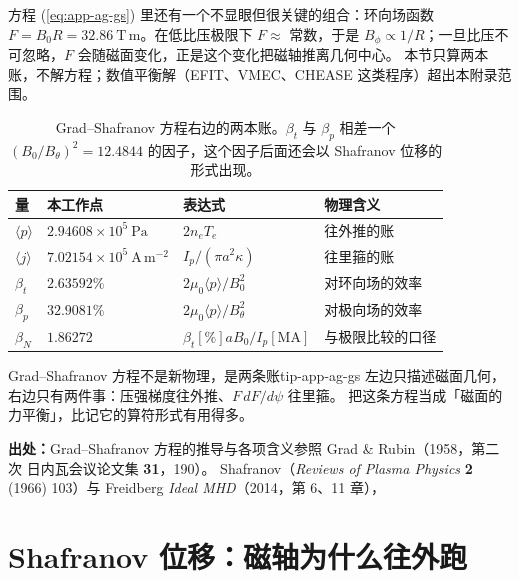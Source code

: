 方程 (\ref{eq:app-ag-gs}) 里还有一个不显眼但很关键的组合：环向场函数
$F=B_0R = 32.86\ \mathrm{T\,m}$。在低比压极限下 $F\approx$ 常数，于是
$B_\phi\propto 1/R$；一旦比压不可忽略，$F$ 会随磁面变化，正是这个变化把磁轴推离几何中心。
本节只算两本账，不解方程；数值平衡解（EFIT、VMEC、CHEASE 这类程序）超出本附录范围。

\begin{table}[htbp]
\centering
\small
\caption{Grad--Shafranov 方程右边的两本账。$\beta_t$ 与 $\beta_p$ 相差一个
$(B_0/B_\theta)^2 = 12.4844$ 的因子，这个因子后面还会以 Shafranov 位移的形式出现。}
\label{tab:app-ag-gs}
\begin{tabular}{p{3.8cm}p{3.0cm}p{3.6cm}p{4.5cm}}
\toprule
量 & 本工作点 & 表达式 & 物理含义 \\
\midrule
$\langle p\rangle$ & $2.94608\times10^{5}\ \mathrm{Pa}$ & $2n_eT_e$ & 往外推的账 \\
$\langle j\rangle$ & $7.02154\times10^{5}\ \mathrm{A\,m^{-2}}$ & $I_p/(\pi a^2\kappa)$ & 往里箍的账 \\
$\beta_t$ & $2.63592\%$ & $2\mu_0\langle p\rangle/B_0^2$ & 对环向场的效率 \\
$\beta_p$ & $32.9081\%$ & $2\mu_0\langle p\rangle/B_\theta^2$ & 对极向场的效率 \\
$\beta_N$ & $1.86272$ & $\beta_t[\%]aB_0/I_p[\mathrm{MA}]$ & 与极限比较的口径 \\
\bottomrule
\end{tabular}

\end{table}

\begin{tip}{Grad--Shafranov 方程不是新物理，是两条账}{tip-app-ag-gs}
左边只描述磁面几何，右边只有两件事：压强梯度往外推、$F\,dF/d\psi$ 往里箍。
把这条方程当成「磁面的力平衡」，比记它的算符形式有用得多。
\end{tip}

{\footnotesize
\textbf{出处：}Grad--Shafranov 方程的推导与各项含义参照 Grad \& Rubin（1958，第二次
日内瓦会议论文集 \textbf{31}，190）。
Shafranov（\emph{Reviews of Plasma Physics}
\textbf{2} (1966) 103）与 Freidberg \emph{Ideal MHD}（2014，第 6、11 章），}

\section{Shafranov 位移：磁轴为什么往外跑}
\label{sec:app-ag-shift}

